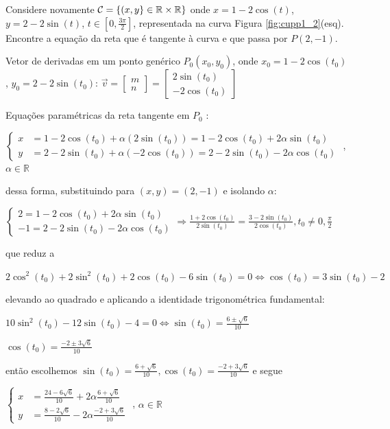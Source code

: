 \begin{exeresol}
Considere novamente ${\cal C} = \{(x,y\} \in \mathbb{R} \times \mathbb{R}\}$ onde $x = 1 - 2\cos(t)$, $y=2-2\sin(t)$, $t \in [0,\frac{3\pi}2]$, representada na curva Figura \ref{fig:cupp1_2}(esq). Encontre a equação da reta que é tangente à curva e que passa por $P(2,-1)$. 
\end{exeresol}
\begin{resol}
Vetor de derivadas em um ponto genérico $P_0(x_0,y_0)$, onde $x_0=1-2\cos(t_0)$ , $y_0 = 2-2\sin(t_0)$:
 $\displaystyle \vec{v} = \left[ \begin{array}{c} m \\ n \end{array} \right] = \left[ \begin{array}{c}
2 \sin(t_0) \\  -2 \cos(t_0) \end{array} \right]$

Equações paramétricas da reta tangente em $P_0$ : 

$\displaystyle \left\{ \begin{array}{ll}
x & = 1-2\cos(t_0) + \alpha (2\sin(t_0)) = 1 - 2\cos(t_0) + 2 \alpha \sin(t_0) \\
y & = 2-2\sin(t_0) + \alpha (-2\cos(t_0)) = 2 - 2 \sin(t_0) - 2\alpha \cos(t_0)
\end{array} \right. $ , $\alpha \in \mathbb{R}$

dessa forma, substituindo para $(x,y) = (2,-1)$ e isolando $\alpha$:

$\displaystyle \left\{ \begin{array}{l}
2  = 1 - 2\cos(t_0) + 2 \alpha \sin(t_0) \\
-1 =  2 - 2 \sin(t_0) - 2\alpha \cos(t_0)
\end{array} \right. \Rightarrow \frac{1+2\cos(t_0)}{2\sin(t_0)} = \frac{3-2\sin(t_0)}{2 \cos(t_0)} , t_0 \neq 0, \frac{\pi}{2} $

que reduz a 
\begin{center}
$2 \cos^2(t_0) + 2 \sin^2(t_0) + 2 \cos(t_0) - 6 \sin(t_0) = 0 \Leftrightarrow \cos(t_0) = 3\sin(t_0)-2$
\end{center}
elevando ao quadrado e aplicando a identidade trigonométrica fundamental:
\begin{center}
$10 \sin^2(t_0) - 12 \sin(t_0)-4 = 0 \Leftrightarrow \sin(t_0) = \frac{6 \pm \sqrt{6}}{10}$

$\cos(t_0) = \frac{-2\pm 3\sqrt{6}}{10} $
\end{center}
então escolhemos $\sin(t_0) = \frac{6 +\sqrt{6}}{10}, \cos(t_0)=\frac{-2+ 3\sqrt{6}}{10} $ e segue

$\displaystyle \left\{ \begin{array}{ll}
x & = \frac{24-6\sqrt{6}}{10}  +  2 \alpha \frac{6+\sqrt{6}}{10} \\
y & = \frac{8-2\sqrt{6}}{10} - 2\alpha \frac{-2 +3\sqrt{6}}{10} 
\end{array} \right. $ ,  $\alpha \in \mathbb{R} $
\end{resol}

